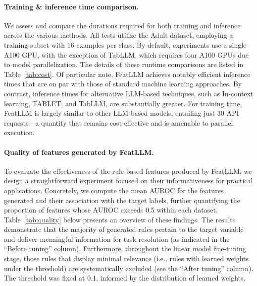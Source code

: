 {\vspace*{-0.12in}
\paragraph{Training \& inference time comparison.} We assess and compare the durations required for both training and inference across the various methods. All tests utilize the Adult dataset, employing a training subset with 16 examples per class. By default, experiments use a single A100 GPU, with the exception of TabLLM, which requires four A100 GPUs due to model parallelization. The details of these runtime comparisons are listed in Table~\ref{tab:cost}. Of particular note, \textsf{FeatLLM} achieves notably efficient inference times that are on par with those of standard machine learning approaches. By contrast, inference times for alternative LLM-based techniques, such as In-context learning, TABLET, and TabLLM, are substantially greater. For training time, \textsf{FeatLLM} is largely similar to other LLM-based models, entailing just 30 API requests—a quantity that remains cost-effective and is amenable to parallel execution.

\vspace*{-0.12in}
\paragraph{Quality of features generated by \textsf{FeatLLM}.}
To evaluate the effectiveness of the rule-based features produced by \textsf{FeatLLM}, we design a straightforward experiment focused on their informativeness for practical applications. Concretely, we compute the mean AUROC for the features generated and their association with the target labels, further quantifying the proportion of features whose AUROC exceeds 0.5 within each dataset. Table~\ref{tab:quality} below presents an overview of these findings. The results demonstrate that the majority of generated rules pertain to the target variable and deliver meaningful information for task resolution (as indicated in the “Before tuning” column). Furthermore, throughout the linear model fine-tuning stage, those rules that display minimal relevance (i.e., rules with learned weights under the threshold) are systematically excluded (see the “After tuning” column). The threshold was fixed at 0.1, informed by the distribution of learned weights.

\vspace*{-0.12in}
}
